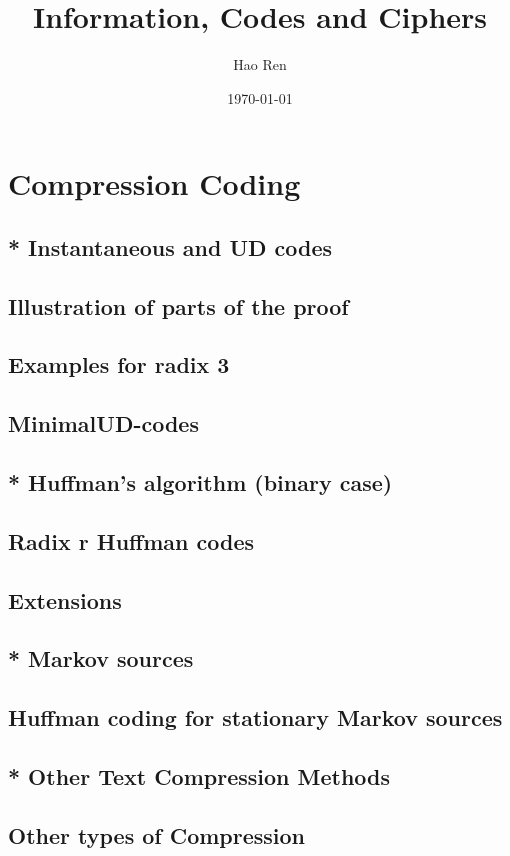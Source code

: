 \documentclass{article}
\begin{document}
\title{Information, Codes and Ciphers}
\author{Hao Ren}
\date{\today}
\maketitle

\setcounter{section}{2}

\newpage

\section{Compression Coding}

\subsection{* Instantaneous and UD codes}

\subsection{Illustration of parts of the proof}

\subsection{Examples for radix 3}

\subsection{MinimalUD-codes}

\subsection{* Huffman’s algorithm (binary case)}

\subsection{Radix r Huffman codes}

\subsection{Extensions}

\subsection{* Markov sources}

\subsection{Huffman coding for stationary Markov sources}

\subsection{* Other Text Compression Methods}

\subsection{Other types of Compression}
\end{document}
